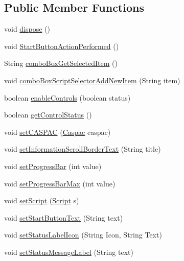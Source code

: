 \subsection*{Public Member Functions}
\begin{DoxyCompactItemize}
\item 
void \hyperlink{interfaceCASUAL_1_1iCASUALGUI_aaae0a373aee8f7939993f184f0cc8b5a}{dispose} ()
\item 
void \hyperlink{interfaceCASUAL_1_1iCASUALGUI_aca8a0966823e8e2c2c8fdb88d20c73bb}{Start\-Button\-Action\-Performed} ()
\item 
String \hyperlink{interfaceCASUAL_1_1iCASUALGUI_a842659e4a515bdb9558082d0f1232f30}{combo\-Box\-Get\-Selected\-Item} ()
\item 
void \hyperlink{interfaceCASUAL_1_1iCASUALGUI_a27a26714a3f630a69be0138fa8393979}{combo\-Box\-Script\-Selector\-Add\-New\-Item} (String item)
\item 
boolean \hyperlink{interfaceCASUAL_1_1iCASUALGUI_a13e5b49519aeda6e1df10ae7680cded9}{enable\-Controls} (boolean status)
\item 
boolean \hyperlink{interfaceCASUAL_1_1iCASUALGUI_a0da22163bda8a58af87b464429dc3386}{get\-Control\-Status} ()
\item 
void \hyperlink{interfaceCASUAL_1_1iCASUALGUI_ad929e91c437aeb24548442633974d220}{set\-C\-A\-S\-P\-A\-C} (\hyperlink{classCASUAL_1_1caspac_1_1Caspac}{Caspac} caspac)
\item 
void \hyperlink{interfaceCASUAL_1_1iCASUALGUI_a3d7accd1069c78528f99e124ce67c399}{set\-Information\-Scroll\-Border\-Text} (String title)
\item 
void \hyperlink{interfaceCASUAL_1_1iCASUALGUI_a7b198a07d16f4f48b39afce9ef721c6e}{set\-Progress\-Bar} (int value)
\item 
void \hyperlink{interfaceCASUAL_1_1iCASUALGUI_afc569857a9e6df91758381d0efdf76e0}{set\-Progress\-Bar\-Max} (int value)
\item 
void \hyperlink{interfaceCASUAL_1_1iCASUALGUI_a98ace169d3438ca1b2c29828bc720040}{set\-Script} (\hyperlink{classCASUAL_1_1caspac_1_1Script}{Script} s)
\item 
void \hyperlink{interfaceCASUAL_1_1iCASUALGUI_ae53420dc6cfc3169e2b9e1ef0baea5f0}{set\-Start\-Button\-Text} (String text)
\item 
void \hyperlink{interfaceCASUAL_1_1iCASUALGUI_aa7560d79744afd442b110512202a10a1}{set\-Status\-Label\-Icon} (String Icon, String Text)
\item 
void \hyperlink{interfaceCASUAL_1_1iCASUALGUI_a584c6b63237727f8420ac25374cfcd30}{set\-Status\-Message\-Label} (String text)

\end{DoxyCompactItemize}

